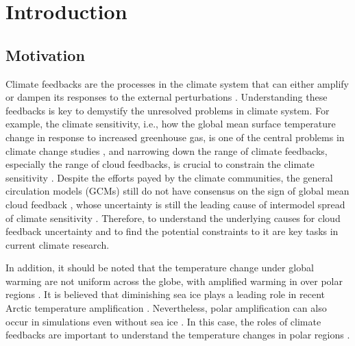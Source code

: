 \chapter{Introduction}
\label{ch:introduction}

\section{Motivation}
\label{sec:motivation_of_thesis}

%


Climate feedbacks are the processes in the climate system that can either amplify or dampen its responses to the external perturbations \citep{Bony2006,Soden2006}. Understanding these feedbacks is key to demystify the unresolved problems in climate system. For example, the climate sensitivity, i.e., how the global mean surface temperature change in response to increased greenhouse gas, is one of the central problems in climate change studies \citep[e.g.,][]{Bony2006,Stocker2013,Sherwood2020}, and narrowing down the range of climate feedbacks, especially the range of cloud feedbacks, is crucial to constrain the climate sensitivity \citep[e.g.][]{Cess1990intercomparison,Webb2006contribution,Vial2013,Zelinka2020causes,Myers2021}. Despite the efforts payed by the climate communities, the general circulation models (GCMs) still do not have consensus on the sign of global mean cloud feedback \citep{Zelinka2020causes}, whose uncertainty is still the leading cause of intermodel spread of climate sensitivity \citep{Ceppi2017,Zelinka2020causes}. Therefore, to understand the underlying causes for cloud feedback uncertainty \citep[e.g.,][]{Bony2005,Vial2013,Qu2014,Webb2015,Zelinka2016insights,Geoffroy2017} and to find the potential constraints to it \citep[e.g.,][]{Qu2015positive,Klein2017low,Myers2016,Scott2020,Myers2021,Ceppi2021observational} are key tasks in current climate research.

In addition, it should be noted that the temperature change under global warming are not uniform across the globe, with amplified warming in over polar regions \citep[`polar amplification'; e.g.,][]{Manabe1975,Pithan2014}. It is believed that diminishing sea ice plays a leading role in recent Arctic temperature amplification \citep{Screen2010}. Nevertheless, polar amplification can also occur in simulations even without sea ice \citep[e.g.,][]{Alexeev2005,Cai2005,Cai2006,Langen2012}. In this case, the roles of climate feedbacks are important to understand the temperature changes in polar regions \cite[e.g.,][]{Pithan2014,Kim2018}.

